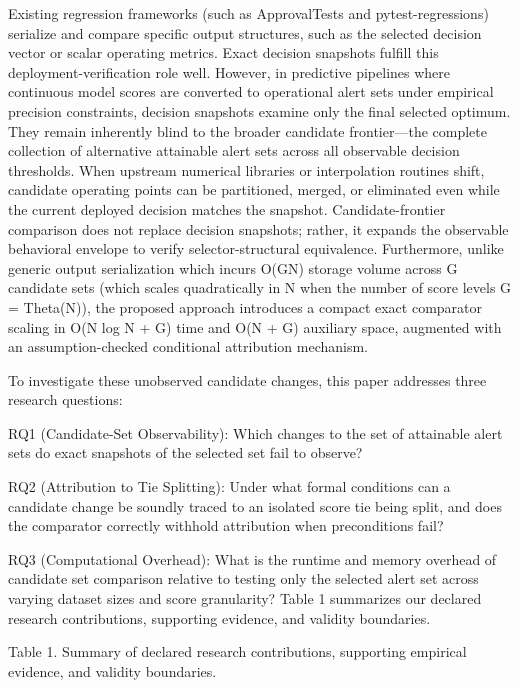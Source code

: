 \documentclass[11pt,a4paper]{article}
\begin{document}
Existing regression frameworks (such as ApprovalTests and pytest-regressions) serialize and compare specific output structures, such as the selected decision vector or scalar operating metrics. Exact decision snapshots fulfill this deployment-verification role well. However, in predictive pipelines where continuous model scores are converted to operational alert sets under empirical precision constraints, decision snapshots examine only the final selected optimum. They remain inherently blind to the broader candidate frontier---the complete collection of alternative attainable alert sets across all observable decision thresholds. When upstream numerical libraries or interpolation routines shift, candidate operating points can be partitioned, merged, or eliminated even while the current deployed decision matches the snapshot. Candidate-frontier comparison does not replace decision snapshots; rather, it expands the observable behavioral envelope to verify selector-structural equivalence. Furthermore, unlike generic output serialization which incurs O(GN) storage volume across G candidate sets (which scales quadratically in N when the number of score levels G = Theta(N)), the proposed approach introduces a compact exact comparator scaling in O(N log N + G) time and O(N + G) auxiliary space, augmented with an assumption-checked conditional attribution mechanism.

To investigate these unobserved candidate changes, this paper addresses three research questions:

\textbullet{} RQ1 (Candidate-Set Observability): Which changes to the set of attainable alert sets do exact snapshots of the selected set fail to observe?

\textbullet{} RQ2 (Attribution to Tie Splitting): Under what formal conditions can a candidate change be soundly traced to an isolated score tie being split, and does the comparator correctly withhold attribution when preconditions fail?

\textbullet{} RQ3 (Computational Overhead): What is the runtime and memory overhead of candidate set comparison relative to testing only the selected alert set across varying dataset sizes and score granularity? Table 1 summarizes our declared research contributions, supporting evidence, and validity boundaries.

Table 1. Summary of declared research contributions, supporting empirical evidence, and validity boundaries.
\end{document}
